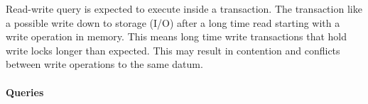 
Read-write query is expected to execute inside a transaction. The transaction
like a possible write down to storage (I/O) after a long time read starting with
a write operation in memory. This means long time write transactions that hold
write locks longer than expected. This may result in contention and conflicts
between write operations to the same datum.



\paragraph{Queries}
{\raggedright
}